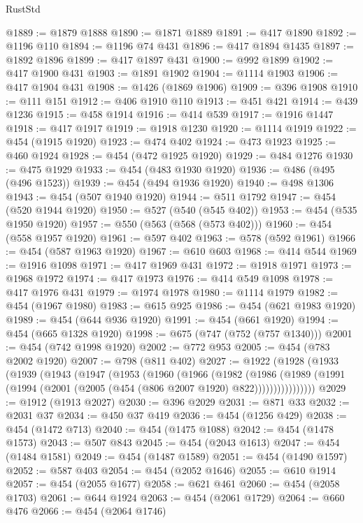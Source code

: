 \begin{lexlean}{RustStd}
\begin{coremodule}
{\begin{coremodule}
{{{{{{{{{{{{{{{{{{{{{{{{{{{{{{{{@1889 := @1879 @1888
@1890 := @1871 @1889
@1891 := @417 @1890
@1892 := @1196 @110
@1894 := @1196 @74 @431
@1896 := @417 @1894 @1435
@1897 := @1892 @1896
@1899 := @417 @1897 @431
@1900 := @992 @1899
@1902 := @417 @1900 @431
@1903 := @1891 @1902
@1904 := @1114 @1903
@1906 := @417 @1904 @431
@1908 := @1426 (@1869 @1906)
@1909 := @396 @1908
@1910 := @111 @151
@1912 := @406 @1910 @110
@1913 := @451 @421
@1914 := @439 @1236
@1915 := @458 @1914
@1916 := @414 @539
@1917 := @1916 @1447
@1918 := @417 @1917
@1919 := @1918 @1230
@1920 := @1114 @1919
@1922 := @454 (@1915 @1920)
@1923 := @474 @402
@1924 := @473 @1923
@1925 := @460 @1924
@1928 := @454 (@472 @1925 @1920)
@1929 := @484 @1276
@1930 := @475 @1929
@1933 := @454 (@483 @1930 @1920)
@1936 := @486 (@495 (@496 @1523))
@1939 := @454 (@494 @1936 @1920)
@1940 := @498 @1306
@1943 := @454 (@507 @1940 @1920)
@1944 := @511 @1792
@1947 := @454 (@520 @1944 @1920)
@1950 := @527 (@540 (@545 @402))
@1953 := @454 (@535 @1950 @1920)
@1957 := @550 (@563 (@568 (@573 @402)))
@1960 := @454 (@558 @1957 @1920)
@1961 := @597 @402
@1963 := @578 (@592 @1961)
@1966 := @454 (@587 @1963 @1920)
@1967 := @610 @603
@1968 := @414 @544
@1969 := @1916 @1098
@1971 := @417 @1969 @431
@1972 := @1918 @1971
@1973 := @1968 @1972
@1974 := @417 @1973
@1976 := @414 @549 @1098
@1978 := @417 @1976 @431
@1979 := @1974 @1978
@1980 := @1114 @1979
@1982 := @454 (@1967 @1980)
@1983 := @615 @925
@1986 := @454 (@621 @1983 @1920)
@1989 := @454 (@644 @936 @1920)
@1991 := @454 (@661 @1920)
@1994 := @454 (@665 @1328 @1920)
@1998 := @675 (@747 (@752 (@757 @1340)))
@2001 := @454 (@742 @1998 @1920)
@2002 := @772 @953
@2005 := @454 (@783 @2002 @1920)
@2007 := @798 (@811 @402)
@2027 := @1922
    (@1928
      (@1933
        (@1939
          (@1943
            (@1947
              (@1953
                (@1960
                  (@1966
                    (@1982
                      (@1986
                        (@1989
                          (@1991 (@1994 (@2001 (@2005 (@454 (@806 @2007 @1920) @822))))))))))))))))
@2029 := @1912 (@1913 @2027)
@2030 := @396 @2029
@2031 := @871 @33
@2032 := @2031 @37
@2034 := @450 @37 @419
@2036 := @454 (@1256 @429)
@2038 := @454 (@1472 @713)
@2040 := @454 (@1475 @1088)
@2042 := @454 (@1478 @1573)
@2043 := @507 @843
@2045 := @454 (@2043 @1613)
@2047 := @454 (@1484 @1581)
@2049 := @454 (@1487 @1589)
@2051 := @454 (@1490 @1597)
@2052 := @587 @403
@2054 := @454 (@2052 @1646)
@2055 := @610 @1914
@2057 := @454 (@2055 @1677)
@2058 := @621 @461
@2060 := @454 (@2058 @1703)
@2061 := @644 @1924
@2063 := @454 (@2061 @1729)
@2064 := @660 @476
@2066 := @454 (@2064 @1746)
}}}}}}}}}}}}}}}}}}}}}}}}}}}}}}}}
\end{coremodule}}
\end{coremodule}
\end{lexlean}
